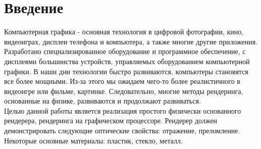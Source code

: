 \chapter*{Введение}


Компьютерная графика - основная технология в цифровой фотографии, кино, видеоиграх,
дисплеи телефона и компьютера,
а также многие другие приложения.
Разработано специализированное оборудование и программное обеспечение,
с дисплеями большинства устройств, управляемых оборудованием компьютерной графики.
В наши дни технологии быстро развиваются, компьютеры становятся все более мощными.
Из-за этого мы ожидаем чего-то более реалистичного в видеоигре или фильме, картинке.
Следовательно, многие методы рендеринга, основанные на физике, развиваются и продолжают развиваться.
\\

Целью данной работы является реализация простого физически основанного рендерера,
рендеринга на графическом процессоре.
Рендерер должен демонстрировать следующие оптические свойства:
отражение, преломление.
Некоторые основные материалы: пластик, стекло, металл.
\\




